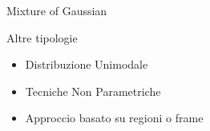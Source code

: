 {\begin{block}{Mixture of Gaussian}
\begin{itemize}
\end{itemize}
\end{block}



\begin{block}{Altre tipologie}
\begin{itemize}
 \item Distribuzione Unimodale
 \item Tecniche Non Parametriche
 \item Approccio basato su regioni o frame
\end{itemize}

\end{block}



}






